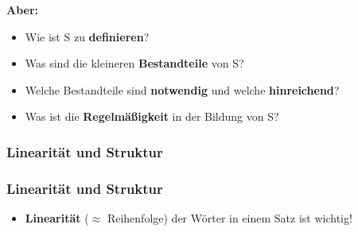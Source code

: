 \begin{frame}

\textbf{Aber: }
	\begin{itemize}
		\item Wie ist S zu \textbf{definieren}?
		\item Was sind die kleineren \textbf{Bestandteile} von S?
		\item Welche Bestandteile sind \textbf{notwendig} und welche \textbf{hinreichend}?
		\item Was ist die \textbf{Regelmäßigkeit} in der Bildung von S?
	\end{itemize}	 	

\end{frame}

\subsubsection{Linearität und Struktur}



\begin{frame}
\frametitle{Linearität und Struktur}

\begin{itemize}
	\item \textbf{Linearität} ($\approx$ Reihenfolge) der Wörter in einem Satz ist wichtig!
	
	\z
	
	\z

\end{itemize}

\end{frame}

